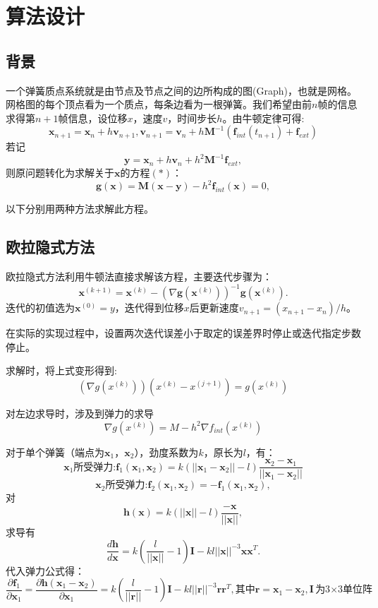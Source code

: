 \documentclass{article}
\begin{document}
	\section{算法设计}
	
	\subsection{背景}
	一个弹簧质点系统就是由节点及节点之间的边所构成的图(Graph)，也就是网格。网格图的每个顶点看为一个质点，每条边看为一根弹簧。我们希望由前$n$帧的信息求得第$n+1$帧信息，设位移$x$，速度$v$，时间步长$h$。由牛顿定律可得:
	$$\boldsymbol x_{n+1}=\boldsymbol x_n+ h \boldsymbol v_{n+1},\boldsymbol v_{n+1}=\boldsymbol v_n+h\boldsymbol M^{-1}(\boldsymbol f_{int}(t_{n+1})+\boldsymbol f_{ext})  $$
		若记 $$ \boldsymbol y =\boldsymbol x_n + h\boldsymbol v_n + h^2\boldsymbol M^{-1}\boldsymbol f_{ext}, $$
		 则原问题转化为求解关于$\boldsymbol x$的方程$(*)$： $$ \boldsymbol g(\boldsymbol x) = \boldsymbol M(\boldsymbol x-\boldsymbol y) -h^2\boldsymbol f_{int}(\boldsymbol x) = 0, $$
		 
		
	以下分别用两种方法求解此方程。
	
	\subsection{欧拉隐式方法}

   欧拉隐式方法利用牛顿法直接求解该方程，主要迭代步骤为： $$ \boldsymbol x^{(k+1)}=\boldsymbol x^{(k)}-(\nabla \boldsymbol g(\boldsymbol x^{(k)}))^{-1}\boldsymbol g(\boldsymbol x^{(k)}). $$
   迭代的初值选为$ \boldsymbol{x}^{(0)}=y$，迭代得到位移$x$后更新速度$v_{n+1}=(x_{n+1}-x_{n})/h$。
   
   在实际的实现过程中，设置两次迭代误差小于取定的误差界时停止或迭代指定步数停止。
   
   求解时，将上式变形得到: $$ (\nabla g(x^{(k)}))(x^{(k)}-x^{(j+1)}) = g(x^{(k)}) $$
   
   对左边求导时，涉及到弹力的求导
                    $$ \nabla g(x^{(k)}) = M-h^2\nabla f_{int}(x^{(k)}) $$
   
  对于单个弹簧（端点为$\boldsymbol x_1$，$\boldsymbol x_2$），劲度系数为$k$，原长为$l$，有： $$ \boldsymbol x_1\text{所受弹力:} \boldsymbol f_1(\boldsymbol x_1,\boldsymbol x_2)=k(||\boldsymbol x_1-\boldsymbol x_2||-l)\frac{\boldsymbol x_2-\boldsymbol x_1}{||\boldsymbol x_1-\boldsymbol x_2||} $$ 
   $$ \boldsymbol x_2\text{所受弹力:} \boldsymbol f_2(\boldsymbol x_1,\boldsymbol x_2)=-\boldsymbol f_1(\boldsymbol x_1,\boldsymbol x_2), $$ 对 $$ \boldsymbol h(\boldsymbol x)=k(||\boldsymbol x||-l)\frac{-\boldsymbol x}{||\boldsymbol x||}, $$ 求导有 $$ \frac{ d \boldsymbol h}{d \boldsymbol x} = k(\frac{l}{||\boldsymbol x||}-1)\boldsymbol I-kl||\boldsymbol x||^{-3}\boldsymbol x \boldsymbol x^T. $$ 代入弹力公式得： $$ \frac{\partial \boldsymbol f_1}{\partial \boldsymbol x_1} =\frac{\partial \boldsymbol h(\boldsymbol x_1-\boldsymbol x_2)}{\partial \boldsymbol x_1}=k(\frac{l}{||\boldsymbol r||}-1)\boldsymbol I-kl||\boldsymbol r||^{-3}\boldsymbol r \boldsymbol r^T,\text{其中}\boldsymbol r=\boldsymbol x_1-\boldsymbol x_2, \boldsymbol I\text{为3$\times$3单位阵}\ $$
   
\end{document}
